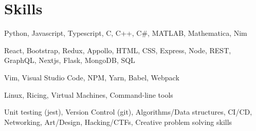\section{Skills}
{Python, Javascript, Typescript, C, C++, C\#, MATLAB, Mathematica, Nim}

{React, Bootstrap, Redux, Appollo, HTML, CSS, Express, Node, REST, GraphQL, Nextjs, Flask, MongoDB, SQL}

{Vim, Visual Studio Code, NPM, Yarn, Babel, Webpack}

{Linux, Ricing, Virtual Machines, Command-line tools}

{Unit testing (jest), Version Control (git), Algorithms/Data structures, CI/CD, Networking, Art/Design, Hacking/CTFs, Creative problem solving skills}
